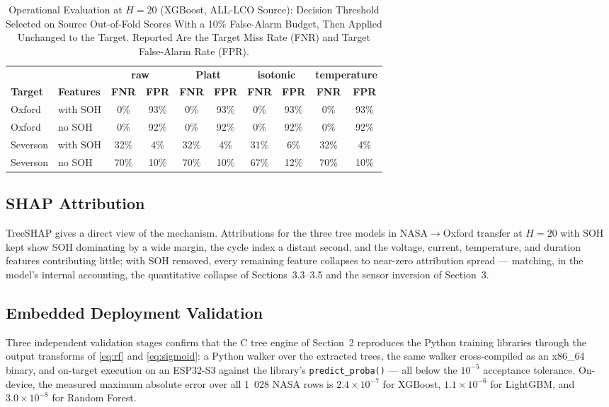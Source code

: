 \documentclass[11pt,a4paper]{article}
\begin{document}
\begin{table}[!t]
\caption{Operational Evaluation at $H{=}20$ (XGBoost, ALL-LCO Source): Decision Threshold Selected on Source Out-of-Fold Scores With a 10\% False-Alarm Budget, Then Applied Unchanged to the Target. Reported Are the Target Miss Rate (FNR) and Target False-Alarm Rate (FPR).}
\label{tab:oper}
\centering
\scriptsize
\setlength{\tabcolsep}{2.5pt}
\begin{tabular}{llcccccccc}
\toprule
 & & \multicolumn{2}{c}{\textbf{raw}} & \multicolumn{2}{c}{\textbf{Platt}} & \multicolumn{2}{c}{\textbf{isotonic}} & \multicolumn{2}{c}{\textbf{temperature}}\\
\cmidrule(lr){3-4}\cmidrule(l){5-6}\cmidrule(l){7-8}\cmidrule(l){9-10}
\textbf{Target} & \textbf{Features} & \textbf{FNR} & \textbf{FPR} & \textbf{FNR} & \textbf{FPR} & \textbf{FNR} & \textbf{FPR} & \textbf{FNR} & \textbf{FPR}\\
\midrule
Oxford & with SOH & 0\% & 93\% & 0\% & 93\% & 0\% & 93\% & 0\% & 93\% \\
Oxford & no SOH & 0\% & 92\% & 0\% & 92\% & 0\% & 92\% & 0\% & 92\% \\
Severson & with SOH & 32\% & 4\% & 32\% & 4\% & 31\% & 6\% & 32\% & 4\% \\
Severson & no SOH & 70\% & 10\% & 70\% & 10\% & 67\% & 12\% & 70\% & 10\% \\
\bottomrule
\end{tabular}
\end{table}

\subsection{SHAP Attribution}
TreeSHAP \cite{lundberg2020from} gives a direct view of the mechanism. Attributions for the three tree models in NASA$\to$Oxford transfer at $H{=}20$ with SOH kept show SOH dominating by a wide margin, the cycle index a distant second, and the voltage, current, temperature, and duration features contributing little; with SOH removed, every remaining feature collapses to near-zero attribution spread --- matching, in the model's internal accounting, the quantitative collapse of Sections~3.3--3.5 and the sensor inversion of Section~3.

\subsection{Embedded Deployment Validation}
Three independent validation stages confirm that the C tree engine of Section~2 reproduces the Python training libraries through the output transforms of \eqref{eq:rf} and \eqref{eq:sigmoid}: a Python walker over the extracted trees, the same walker cross-compiled as an x86\_64 binary, and on-target execution on an ESP32-S3 against the library's \texttt{predict\_proba()} --- all below the $10^{-5}$ acceptance tolerance. On-device, the measured maximum absolute error over all 1~028 NASA rows is $2.4\times10^{-7}$ for XGBoost, $1.1\times10^{-6}$ for LightGBM, and $3.0\times10^{-8}$ for Random Forest.
\end{document}
